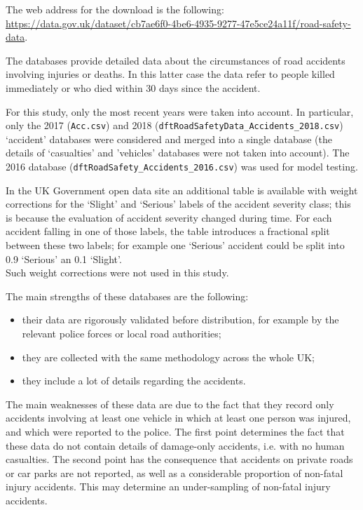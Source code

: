 \documentclass[11pt]{article}
\providecommand{\tightlist}{%
      \setlength{\itemsep}{0pt}\setlength{\parskip}{0pt}}
\begin{document}
The web address for the download is the following:\\
\url{https://data.gov.uk/dataset/cb7ae6f0-4be6-4935-9277-47e5ce24a11f/road-safety-data}.

The databases provide detailed data about the circumstances of road accidents involving injuries or deaths. In this latter case the data refer to people killed immediately or who died within 30 days since the accident.

For this study, only the most recent years were taken into account. In particular, only the 2017 (\texttt{Acc.csv}) and 2018 (\texttt{dftRoadSafetyData\_Accidents\_2018.csv}) `accident' databases were considered and merged into a single database (the details of `casualties' and 'vehicles' databases were not taken into account). The 2016 database (\texttt{dftRoadSafety\_Accidents\_2016.csv}) was used for model testing.

In the UK Government open data site an additional table is available  with weight corrections for the `Slight' and `Serious' labels of the accident severity class; this is because the evaluation of accident severity changed during time. For each accident falling in one of those labels, the table introduces a fractional split between these two labels; for example one `Serious' accident could be split into 0.9 `Serious' an 0.1 `Slight'.\\
Such weight corrections were not used in this study.

The main strengths of these databases are the following:
\begin{itemize}
\tightlist
\item
their data are rigorously validated before distribution, for example by the relevant police forces or local road authorities;
\item
they are collected with the same methodology across the whole UK;
\item
they include a lot of details regarding the accidents.
\end{itemize}

The main weaknesses of these data are due to the fact that they record only accidents involving at least one vehicle in which at least one person was injured, and which were reported to the police. The first point determines the fact that these data do not contain details of damage-only accidents, i.e. with no human casualties. The second point has the consequence that accidents on private roads or car parks are not reported, as well as a considerable proportion of non-fatal injury accidents.  
This may determine an under-sampling of non-fatal injury accidents.
\end{document}
